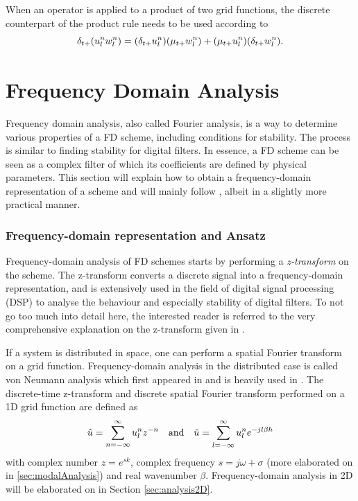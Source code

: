 When an operator is applied to a product of two grid functions, the discrete counterpart of the product rule needs to be used according to
\begin{equation}
    \delta_{t+} (u_l^nw_l^n) = (\delta_{t+} u_l^n)(\mu_{t+}w_l^n) + (\mu_{t+} u_l^n)(\delta_{t+} w_l^n).
\end{equation}

\section{Frequency Domain Analysis}\label{sec:stabilityAnalysis}
Frequency domain analysis, also called Fourier analysis, is a way to determine various properties of a FD scheme, including conditions for stability. The process is similar to finding stability for digital filters. In essence, a FD scheme can be seen as a complex filter of which its coefficients are defined by physical parameters. This section will explain how to obtain a frequency-domain representation of a scheme and will mainly follow \cite{theBible}, albeit in a slightly more practical manner.

\subsubsection{Frequency-domain representation and Ansatz}
Frequency-domain analysis of FD schemes starts by performing a \textit{z-transform} on the scheme. The z-transform converts a discrete signal into a frequency-domain representation, and is extensively used in the field of digital signal processing (DSP) to analyse the behaviour and especially stability of digital filters. To not go too much into detail here, the interested reader is referred to the very comprehensive explanation on the z-transform given in \cite[Ch. 5]{Park2010}. 

If a system is distributed in space, one can perform a spatial Fourier transform on a grid function. Frequency-domain analysis in the distributed case is called von Neumann analysis which first appeared in \cite{Strikwerda1989} and is heavily used in \cite{theBible}. The discrete-time z-transform and discrete spatial Fourier transform performed on a 1D grid function are defined as \cite{theBible}
\begin{equation}
    \hat u  = \sum_{n=-\infty}^\infty u_l^n z^{-n}\quad \text{and} \quad \tilde u = \sum_{l=-\infty}^\infty u_l^n e^{-jl\beta h}
\end{equation}
with complex number $z = e^{sk}$, complex frequency $s=j\omega + \sigma$ (more elaborated on in \ref{sec:modalAnalysis}) and real wavenumber $\beta$. Frequency-domain analysis in 2D will be elaborated on in Section \ref{sec:analysis2D}.

